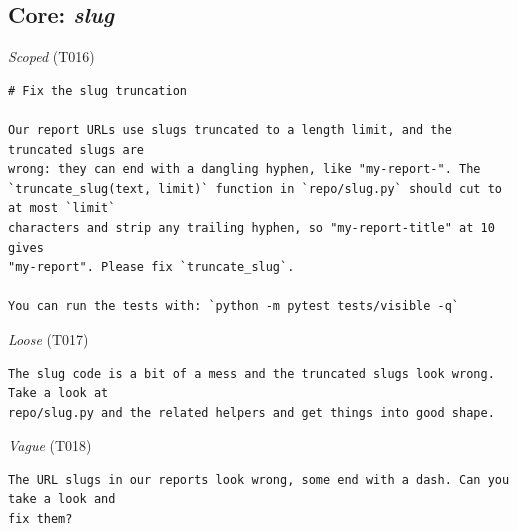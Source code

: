 \subsection*{Core: \emph{slug}}
\noindent\textit{Scoped} (T016)
\begin{Verbatim}[fontsize=\footnotesize,frame=leftline,xleftmargin=1em]
# Fix the slug truncation

Our report URLs use slugs truncated to a length limit, and the truncated slugs are
wrong: they can end with a dangling hyphen, like "my-report-". The
`truncate_slug(text, limit)` function in `repo/slug.py` should cut to at most `limit`
characters and strip any trailing hyphen, so "my-report-title" at 10 gives
"my-report". Please fix `truncate_slug`.

You can run the tests with: `python -m pytest tests/visible -q`
\end{Verbatim}

\noindent\textit{Loose} (T017)
\begin{Verbatim}[fontsize=\footnotesize,frame=leftline,xleftmargin=1em]
The slug code is a bit of a mess and the truncated slugs look wrong. Take a look at
repo/slug.py and the related helpers and get things into good shape.
\end{Verbatim}

\noindent\textit{Vague} (T018)
\begin{Verbatim}[fontsize=\footnotesize,frame=leftline,xleftmargin=1em]
The URL slugs in our reports look wrong, some end with a dash. Can you take a look and
fix them?
\end{Verbatim}

